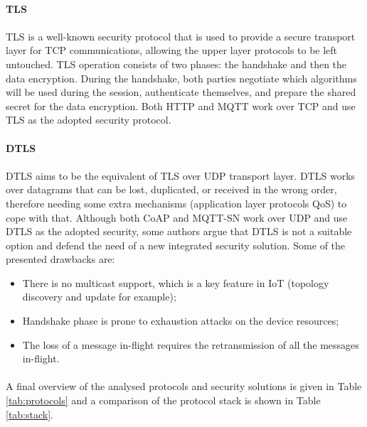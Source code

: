 \paragraph{\textbf{\gls{TLS}}}
\paragraph{}
	\gls{TLS} is a well-known security protocol that is used to provide a secure transport layer for \gls{TCP} communications, allowing the upper layer protocols to be left untouched. \gls{TLS} operation consists of two phases: the handshake and then the data encryption. During the handshake, both parties negotiate which algorithms will be used during the session, authenticate themselves, and prepare the shared secret for the data encryption.
	Both \gls{HTTP} and \gls{MQTT} work over \gls{TCP} and use \gls{TLS} as the adopted security protocol.

\paragraph{\textbf{\gls{DTLS}}}
\paragraph{}
	\gls{DTLS} aims to be the equivalent of \gls{TLS} over \gls{UDP} transport layer. \gls{DTLS} works over datagrams that can be lost, duplicated, or received in the wrong order, therefore needing some extra mechanisms (application layer protocols \gls{QoS}) to cope with that. Although both \gls{CoAP} and \gls{MQTT-SN} work over \gls{UDP} and use \gls{DTLS} as the adopted security, some authors argue that \gls{DTLS} is not a suitable option \cite{Alghamdi2013} and defend the need of a new integrated security solution. Some of the presented drawbacks are:

\begin{itemize}
	\item There is no multicast support, which is a key feature in \gls{IoT} (topology discovery and update for example);\\
	\item Handshake phase is prone to exhaustion attacks on the device resources;\\
	\item The loss of a message in-flight requires the retransmission of all the messages in-flight.
\end{itemize}

\paragraph{}
	A final overview of the analysed protocols and security solutions is given in Table \ref{tab:protocols} and a comparison of the protocol stack is shown in Table \ref{tab:stack}. 

